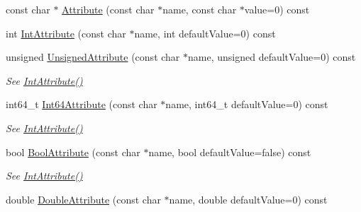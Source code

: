 \begin{DoxyCompactItemize}
const char $\ast$ \mbox{\hyperlink{classtinyxml2_1_1XMLElement_a70e49ed60b11212ae35f7e354cfe1de9}{Attribute}} (const char $\ast$name, const char $\ast$value=0) const
\item 
int \mbox{\hyperlink{classtinyxml2_1_1XMLElement_a95a89b13bb14a2d4655e2b5b406c00d4}{Int\+Attribute}} (const char $\ast$name, int default\+Value=0) const
\item 
\mbox{\label{classtinyxml2_1_1XMLElement_afea43a1d4aa33e3703ddee5fc9adc26c}} 
unsigned \mbox{\hyperlink{classtinyxml2_1_1XMLElement_afea43a1d4aa33e3703ddee5fc9adc26c}{Unsigned\+Attribute}} (const char $\ast$name, unsigned default\+Value=0) const
\begin{DoxyCompactList}\small\item\em See \mbox{\hyperlink{classtinyxml2_1_1XMLElement_a95a89b13bb14a2d4655e2b5b406c00d4}{Int\+Attribute()}} \end{DoxyCompactList}\item 
\mbox{\label{classtinyxml2_1_1XMLElement_a66d96972adecd816194191f13cc4a0a0}} 
int64\+\_\+t \mbox{\hyperlink{classtinyxml2_1_1XMLElement_a66d96972adecd816194191f13cc4a0a0}{Int64\+Attribute}} (const char $\ast$name, int64\+\_\+t default\+Value=0) const
\begin{DoxyCompactList}\small\item\em See \mbox{\hyperlink{classtinyxml2_1_1XMLElement_a95a89b13bb14a2d4655e2b5b406c00d4}{Int\+Attribute()}} \end{DoxyCompactList}\item 
\mbox{\label{classtinyxml2_1_1XMLElement_a53eda26131e1ad1031ef8ec8adb51bd8}} 
bool \mbox{\hyperlink{classtinyxml2_1_1XMLElement_a53eda26131e1ad1031ef8ec8adb51bd8}{Bool\+Attribute}} (const char $\ast$name, bool default\+Value=false) const
\begin{DoxyCompactList}\small\item\em See \mbox{\hyperlink{classtinyxml2_1_1XMLElement_a95a89b13bb14a2d4655e2b5b406c00d4}{Int\+Attribute()}} \end{DoxyCompactList}\item 
\mbox{\label{classtinyxml2_1_1XMLElement_a10a90c505aea716bf073eea1c97f33b5}} 
double \mbox{\hyperlink{classtinyxml2_1_1XMLElement_a10a90c505aea716bf073eea1c97f33b5}{Double\+Attribute}} (const char $\ast$name, double default\+Value=0) const

\end{DoxyCompactItemize}
